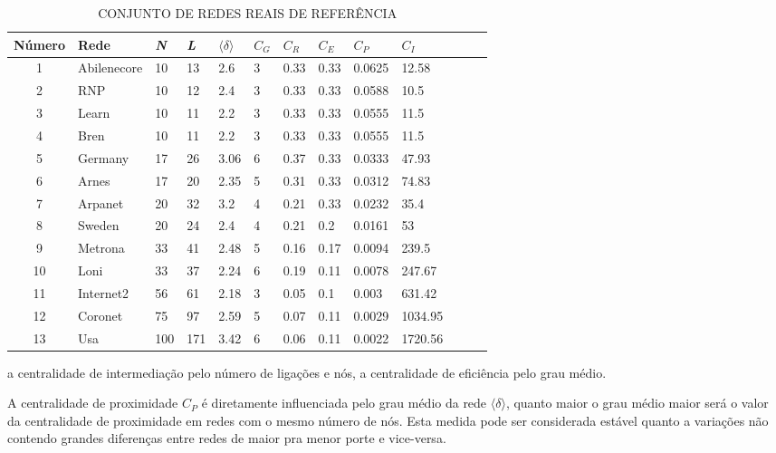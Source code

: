 \documentclass[12pt]{article}
\begin{document}
\begin{table}[htp]
\caption{CONJUNTO DE REDES REAIS DE REFERÊNCIA}\label{tab:tab1}
\centering
\begin{tabular}{cll*{9}{l}r}
\hline\rowcolor{Gray}
Número & Rede & \textit{N} & \textit{L} & $\langle \delta \rangle$ & $C_G$ & $C_R$ & $C_E$ & $C_P$ & $C_I$\\ 
\hline
1   &Abilenecore &10    &13     &2.6    &3   &0.33    &0.33     &0.0625     & 12.58\\
2   &RNP        &10     &12     & 2.4   &3   &0.33    &0.33     &0.0588     &10.5\\
3   &Learn      &10     & 11    &2.2    &3   &0.33    &0.33     &0.0555     &11.5\\
4   &Bren       &10     & 11    &2.2    &3   &0.33    &0.33     &0.0555     &11.5\\
5   &Germany    &17     & 26    &3.06   &6   &0.37    &0.33     &0.0333     &47.93\\
6   &Arnes      &17     & 20    &2.35   &5   &0.31    &0.33     &0.0312     &74.83\\
7   &Arpanet    &20     & 32    &3.2    &4   & 0.21   &0.33     & 0.0232    &35.4\\
8   &Sweden     &20     & 24    &2.4    &4   & 0.21   &0.2&     0.0161      &53\\
9   &Metrona    &33     & 41    &2.48   &5   & 0.16   &0.17     & 0.0094    &239.5\\
10  &Loni       &33     & 37    &2.24   & 6  & 0.19   &0.11     & 0.0078    &247.67\\
11  &Internet2  &56     & 61    &2.18   & 3  & 0.05   &0.1      &0.003      &631.42\\
12  &Coronet    &75     & 97    & 2.59  & 5  & 0.07   &0.11     & 0.0029    &1034.95\\
13  &Usa        &100    &171    & 3.42  & 6  &0.06    &0.11     & 0.0022    &1720.56\\
\hline
\end{tabular}
\end{table}

 a centralidade de intermediação pelo número de ligações e nós, a centralidade de eficiência pelo grau médio.
 
A centralidade de proximidade $C_P$ é diretamente influenciada pelo grau médio da rede $\langle \delta \rangle$, quanto maior o grau médio maior será o valor da centralidade de proximidade em redes com o mesmo número de nós. Esta medida pode ser considerada estável quanto a variações não contendo grandes diferenças entre redes de maior pra menor porte e vice-versa.
\end{document}
